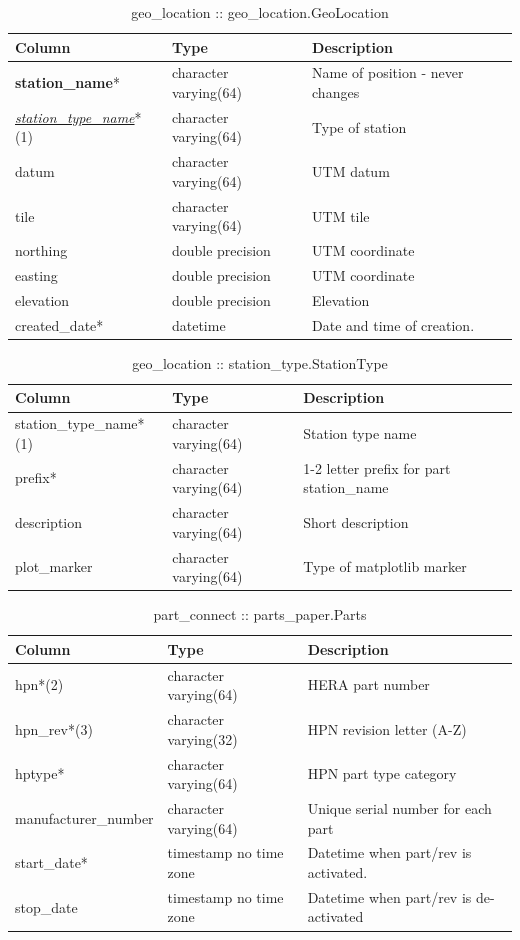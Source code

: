 \documentclass{article}
\begin{document}
\begin{table}[h]
\centering
\caption{geo\_location :: geo\_location.GeoLocation}
\begin{tabular}{| l | l | l |} \hline
{\bf Column} & {\bf Type} & {\bf Description} \\ \hline
{\bf station\_name}*  & character varying(64) & Name of position - never changes \\ \hline
{\em \underline{station\_type\_name}}*(1) & character varying(64) & Type of station \\ \hline
datum & character varying(64) & UTM datum \\ \hline
tile & character varying(64) & UTM tile \\ \hline
northing & double precision & UTM coordinate \\ \hline
easting & double precision & UTM coordinate \\ \hline
elevation & double precision & Elevation \\ \hline
created\_date* & datetime & Date and time of creation. \\ \hline
\end{tabular}
\end{table}

\begin{table}[h]
\centering
\caption{geo\_location :: station\_type.StationType}
\begin{tabular}{| l | l | l |} \hline
{\bf Column} & {\bf Type} & {\bf Description} \\ \hline
station\_type\_name*(1) &  character varying(64) &  Station type name \\ \hline
prefix* & character varying(64) & 1-2 letter prefix for part station\_name \\ \hline
description & character varying(64) &  Short description \\ \hline
plot\_marker & character varying(64) & Type of matplotlib marker \\ \hline
\end{tabular}
\end{table}

\begin{table}[h]
\centering
\caption{part\_connect :: parts\_paper.Parts}
\begin{tabular}{| l | l | l |} \hline
{\bf Column} & {\bf Type} & {\bf Description} \\ \hline
 hpn*(2) & character varying(64) & HERA part number \\ \hline
hpn\_rev*(3) & character varying(32) & HPN revision letter (A-Z) \\ \hline
hptype*  &  character varying(64) & HPN part type category \\ \hline
manufacturer\_number & character varying(64) & Unique serial number for each part \\ \hline
start\_date* & timestamp no time zone & Datetime when part/rev is activated. \\ \hline
stop\_date & timestamp no time zone & Datetime when part/rev is de-activated \\ \hline
\end{tabular}
\end{table}
\end{document}

